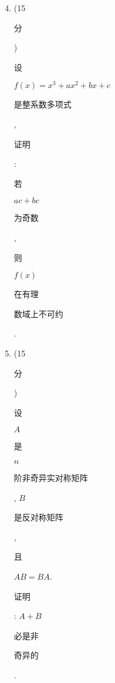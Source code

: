\documentclass[10pt]{article}
\begin{document}
\begin{enumerate}
  \setcounter{enumi}{3}
  \item (15 \begin{CJK}{UTF8}{mj}分\end{CJK}) \begin{CJK}{UTF8}{mj}设\end{CJK} $f(x)=x^{3}+a x^{2}+b x+c$ \begin{CJK}{UTF8}{mj}是整系数多项式\end{CJK}, \begin{CJK}{UTF8}{mj}证明\end{CJK}: \begin{CJK}{UTF8}{mj}若\end{CJK} $a c+b c$ \begin{CJK}{UTF8}{mj}为奇数\end{CJK}, \begin{CJK}{UTF8}{mj}则\end{CJK} $f(x)$ \begin{CJK}{UTF8}{mj}在有理\end{CJK} \begin{CJK}{UTF8}{mj}数域上不可约\end{CJK}.

  \item (15 \begin{CJK}{UTF8}{mj}分\end{CJK}) \begin{CJK}{UTF8}{mj}设\end{CJK} $A$ \begin{CJK}{UTF8}{mj}是\end{CJK} $n$ \begin{CJK}{UTF8}{mj}阶非奇异实对称矩阵\end{CJK}, $B$ \begin{CJK}{UTF8}{mj}是反对称矩阵\end{CJK}, \begin{CJK}{UTF8}{mj}且\end{CJK} $A B=B A$. \begin{CJK}{UTF8}{mj}证明\end{CJK}: $A+B$ \begin{CJK}{UTF8}{mj}必是非\end{CJK} \begin{CJK}{UTF8}{mj}奇异的\end{CJK}.


\end{enumerate}
\end{document}
